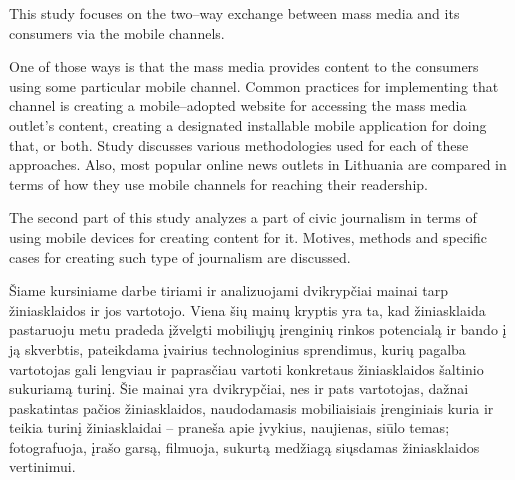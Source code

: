 \documentclass[kursinis-darbas]{vukf}
\begin{document}
\begin{vukfAbstractEn}

This study focuses on the two–way exchange between mass media and its consumers via the mobile channels.

One of those ways is that the mass media provides content to the consumers using some particular mobile channel. Common practices for implementing that channel is creating a mobile–adopted website for accessing the mass media outlet's content, creating a designated installable mobile application for doing that, or both. Study discusses various methodologies used for each of these approaches. Also, most popular online news outlets in Lithuania are compared in terms of how they use mobile channels for reaching their readership.

The second part of this study analyzes a part of civic journalism in terms of using mobile devices for creating content for it. Motives, methods and specific cases for creating such type of journalism are discussed.

\end{vukfAbstractEn}


%
%





%
%

\vukfIntroduction


Šiame kursiniame darbe tiriami ir analizuojami dvikrypčiai mainai tarp žiniasklaidos ir jos vartotojo. Viena šių mainų kryptis yra ta, kad žiniasklaida pastaruoju metu pradeda įžvelgti mobiliųjų įrenginių rinkos potencialą ir bando į ją skverbtis, pateikdama įvairius technologinius sprendimus, kurių pagalba vartotojas gali lengviau ir paprasčiau vartoti konkretaus žiniasklaidos šaltinio sukuriamą turinį. Šie mainai yra dvikrypčiai, nes ir pats vartotojas, dažnai paskatintas pačios žiniasklaidos, naudodamasis mobiliaisiais įrenginiais kuria ir teikia turinį žiniasklaidai – praneša apie įvykius, naujienas, siūlo temas; fotografuoja, įrašo garsą, filmuoja, sukurtą medžiagą siųsdamas žiniasklaidos vertinimui.
\end{document}
